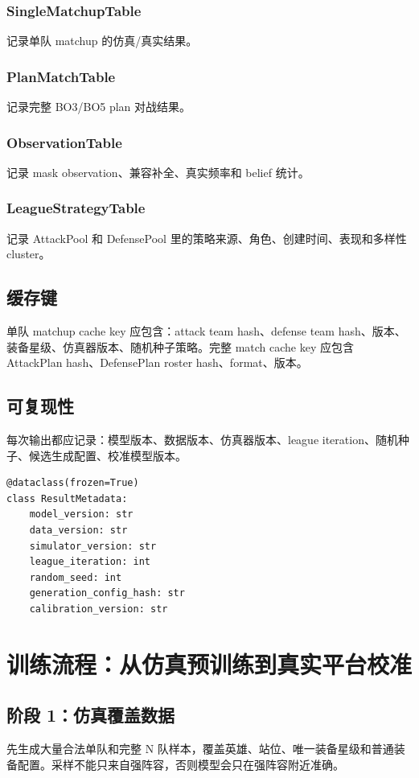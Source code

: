 \documentclass[UTF8,12pt,openany]{ctexbook}
\begin{document}
\subsection{SingleMatchupTable}
记录单队 matchup 的仿真/真实结果。
\subsection{PlanMatchTable}
记录完整 BO3/BO5 plan 对战结果。
\subsection{ObservationTable}
记录 mask observation、兼容补全、真实频率和 belief 统计。
\subsection{LeagueStrategyTable}
记录 AttackPool 和 DefensePool 里的策略来源、角色、创建时间、表现和多样性 cluster。

\section{缓存键}
单队 matchup cache key 应包含：attack team hash、defense team hash、版本、装备星级、仿真器版本、随机种子策略。完整 match cache key 应包含 AttackPlan hash、DefensePlan roster hash、format、版本。

\section{可复现性}
每次输出都应记录：模型版本、数据版本、仿真器版本、league iteration、随机种子、候选生成配置、校准模型版本。

\begin{lstlisting}[caption={ResultMetadata}]
@dataclass(frozen=True)
class ResultMetadata:
    model_version: str
    data_version: str
    simulator_version: str
    league_iteration: int
    random_seed: int
    generation_config_hash: str
    calibration_version: str
\end{lstlisting}


\chapter{训练流程：从仿真预训练到真实平台校准}

\section{阶段 1：仿真覆盖数据}
先生成大量合法单队和完整 N 队样本，覆盖英雄、站位、唯一装备星级和普通装备配置。采样不能只来自强阵容，否则模型会只在强阵容附近准确。
\end{document}
